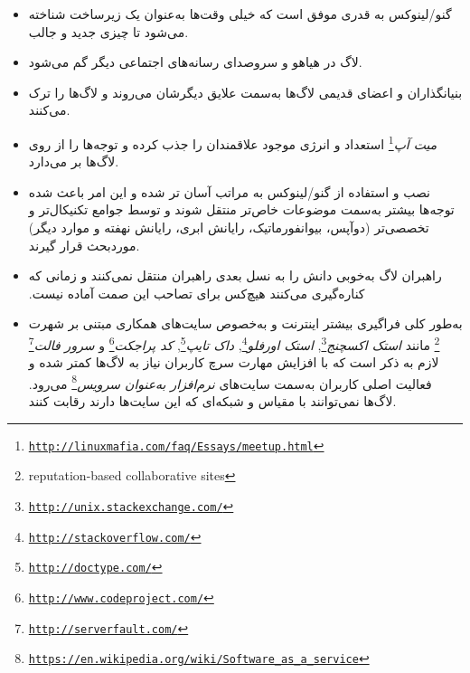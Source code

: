 \begin{itemize}
\item 
گنو/لینوکس به قدری موفق است که خیلی وقت‌ها به‌عنوان یک زیرساخت شناخته می‌شود تا چیزی جدید و جالب.

\item
لاگ در هیاهو و سروصدای رسانه‌های اجتماعی دیگر گم می‌شود.
\item
بنیانگذاران و اعضای قدیمی لاگ‌ها به‌سمت علایق دیگرشان می‌روند و لاگ‌ها را ترک می‌کنند.

\item 
\emph{میت آپ}\footnote{\texttt{\url{http://linuxmafia.com/faq/Essays/meetup.html}}}
استعداد و انرژی موجود علاقمندان را جذب کرده و توجه‌ها را از روی لاگ‌ها بر می‌دارد.

\item
نصب و استفاده از گنو/لینوکس به مراتب آسان تر شده و این امر باعث شده
توجه‌ها بیشتر به‌سمت موضوعات خاص‌تر منتقل شوند و توسط جوامع تکنیکال‌تر
و تخصصی‌تر‌ (دوآپس، بیوانفورماتیک، رایانش ابری، رایانش نهفته و موارد دیگر)
موردبحث قرار گیرند.


\item
راهبران لاگ ‫به‌خوبی دانش را به نسل بعدی راهبران منتقل نمی‌کنند و زمانی که
کناره‌گیری می‌کنند هیچ‌کس برای تصاحب این صمت آماده نیست.

\item
به‌طور کلی فراگیری بیشتر اینترنت و به‌خصوص سایت‌های همکاری مبتنی بر شهرت
\footnote{reputation-based collaborative sites}
مانند
\emph{استک اکسچنج}\footnote{\texttt{\url{http://unix.stackexchange.com/}}},
\emph{استک اورفلو}\footnote{\texttt{\url{http://stackoverflow.com/}}},
\emph{داک تایپ}\footnote{\texttt{\url{http://doctype.com/}}},
\emph{کد پراجکت}\footnote{\texttt{\url{http://www.codeproject.com/}}}
و
\emph{سرور فالت}\footnote{\texttt{\url{http://serverfault.com/}}}
لازم‌ به ذکر است که با افزایش مهارت سرچ کاربران نیاز به لاگ‌ها کمتر شده
و فعالیت اصلی کاربران به‌سمت سایت‌های
\emph{نرم‌‌افزار به‌عنوان سرویس}\footnote{\texttt{\url{https://en.wikipedia.org/wiki/Software_as_a_service}}}
می‌رود. لاگ‌ها نمی‌توانند با مقیاس و شبکه‌ای که این سایت‌ها دارند رقابت کنند.


\end{itemize}
